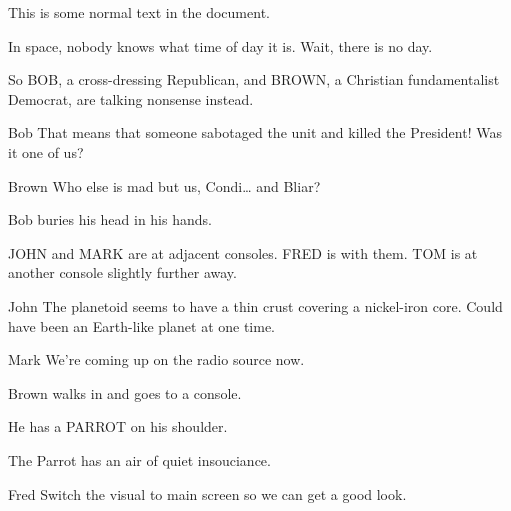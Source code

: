\documentclass{article}
\begin{document}

This is some normal text in the document. \lipsum[1]

\begin{screenplay}
\fadein


In space, nobody knows what time of day it is.  Wait, there is no
day.

So BOB, a cross-dressing Republican, and BROWN, a Christian
fundamentalist Democrat, are talking nonsense instead.

\begin{dialogue}{Bob}
That means that someone
sabotaged the unit and killed the
President! Was it one of us?
\end{dialogue}
\begin{dialogue}{Brown}
Who else is mad but us, Condi\ldots
and Bliar?
\end{dialogue}

Bob buries his head in his hands.


JOHN and MARK are at adjacent consoles. FRED is with them. TOM
is at another console slightly further away.

\begin{dialogue}{John}
The planetoid seems to have a thin crust
covering a nickel-iron core. Could have
been an Earth-like planet at one time.
\end{dialogue}

\begin{dialogue}{Mark}
We're coming up on the radio source now.
\end{dialogue}

Brown walks in and goes to a console.

He has a PARROT on his shoulder.

The Parrot has an air of quiet insouciance.

\begin{dialogue}{Fred}
Switch the visual to main screen so we
can get a good look.\end{dialogue}


\end{screenplay}
\end{document}
